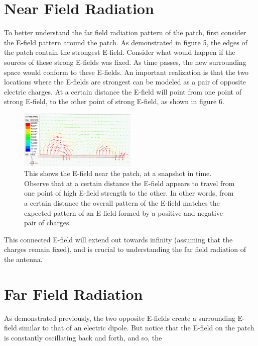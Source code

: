 \documentclass[12pt]{article}
\begin{document}
\section{Near Field Radiation}

To better understand the far field radiation pattern of the patch, first consider the E-field pattern around the patch. As demonstrated in figure 5, the edges of the patch contain the strongest E-field. Consider what would happen if the sources of these strong E-fields was fixed. As time passes, the new surrounding space would conform to these E-fields. An important realization is that the two locations where the E-fields are strongest can be modeled as a pair of opposite electric charges. At a certain distance the E-field will point from one point of strong E-field, to the other point of strong E-field, as shown in figure 6.

\begin{figure}[h]
    \centering
    \includegraphics[width=0.5\textwidth]{basic-patch-antenna-near-Efield.png}
    \caption{This shows the E-field near the patch, at a snapshot in time. Observe that at a certain distance the E-field appears to travel from one point of high E-field strength to the other. In other words, from a certain distance the overall pattern of the E-field matches the expected pattern of an E-field formed by a positive and negative pair of charges.}
\end{figure}  
This connected E-field will extend out towards infinity (assuming that the charges remain fixed), and is crucial to understanding the far field radiation of the antenna. 

\section{Far Field Radiation}

As demonstrated previously, the two opposite E-fields create a surrounding E-field similar to that of an electric dipole. But notice that the E-field on the patch is constantly oscillating back and forth, and so, the 
\end{document}
